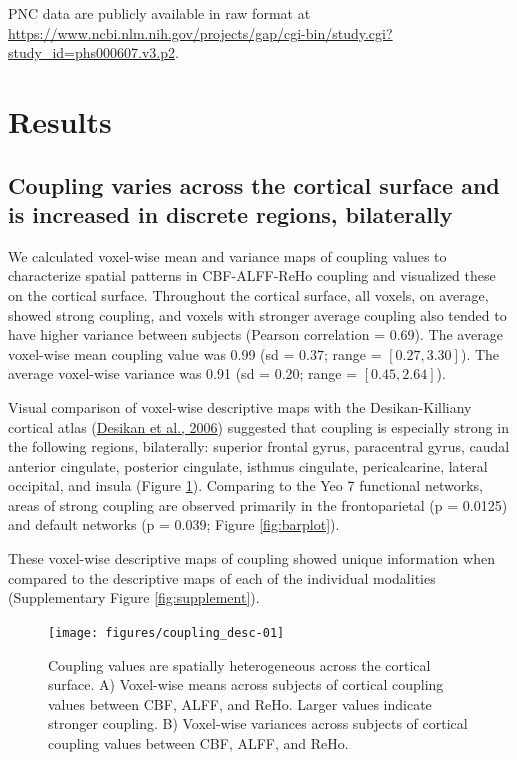 \documentclass[
  12pt,
]{article}
\begin{document}
PNC data are publicly available in raw format at \url{https://www.ncbi.nlm.nih.gov/projects/gap/cgi-bin/study.cgi?study_id=phs000607.v3.p2}.

\hypertarget{results}{%
\section{Results}\label{results}}

\hypertarget{coupling-varies-across-the-cortical-surface-and-is-increased-in-discrete-regions-bilaterally}{%
\subsection{Coupling varies across the cortical surface and is increased in discrete regions, bilaterally}\label{coupling-varies-across-the-cortical-surface-and-is-increased-in-discrete-regions-bilaterally}}

We calculated voxel-wise mean and variance maps of coupling values to characterize spatial patterns in CBF-ALFF-ReHo coupling and visualized these on the cortical surface. Throughout the cortical surface, all voxels, on average, showed strong coupling, and voxels with stronger average coupling also tended to have higher variance between subjects (Pearson correlation = 0.69). The average voxel-wise mean coupling value was 0.99 (sd = 0.37; range = \([0.27, 3.30]\)). The average voxel-wise variance was 0.91 (sd = 0.20; range = \([0.45, 2.64]\)).

Visual comparison of voxel-wise descriptive maps with the Desikan-Killiany cortical atlas (\protect\hyperlink{ref-desikanAutomatedLabelingSystem2006a}{Desikan et al., 2006}) suggested that coupling is especially strong in the following regions, bilaterally: superior frontal gyrus, paracentral gyrus, caudal anterior cingulate, posterior cingulate, isthmus cingulate, pericalcarine, lateral occipital, and insula (Figure \ref{fig:desc}). Comparing to the Yeo 7 functional networks, areas of strong coupling are observed primarily in the frontoparietal (p = 0.0125) and default networks (p = 0.039; Figure \ref{fig:barplot}).

These voxel-wise descriptive maps of coupling showed unique information when compared to the descriptive maps of each of the individual modalities (Supplementary Figure \ref{fig:supplement}).

\begin{figure}
\texttt{[image: figures/coupling\_desc-01]} \caption{Coupling values are spatially heterogeneous across the cortical surface. A) Voxel-wise means across subjects of cortical coupling values between CBF, ALFF, and ReHo. Larger values indicate stronger coupling. B) Voxel-wise variances across subjects of cortical coupling values between CBF, ALFF, and ReHo.}\label{fig:desc}
\end{figure}
\end{document}
